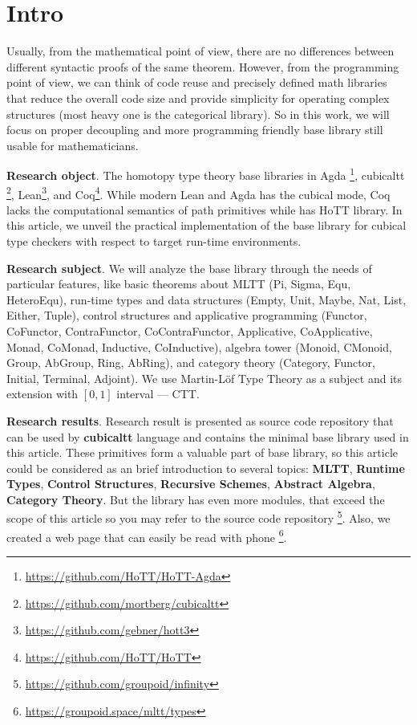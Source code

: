 \documentclass{article}
\begin{document}
\newpage
\tableofcontents

\newpage
\section{Intro}

Usually, from the mathematical point of view, there are no differences between
different syntactic proofs of the same theorem. However, from the programming point of view, we can think of code reuse and precisely defined math libraries that reduce
the overall code size and provide simplicity for operating complex
structures (most heavy one is the categorical library). So in this work, we will focus
on proper decoupling and more programming friendly base library still usable
for mathematicians.

{\bf Research object}. The homotopy type theory base libraries in
Agda \footnote{\url{https://github.com/HoTT/HoTT-Agda}},
cubicaltt \footnote{\url{https://github.com/mortberg/cubicaltt}},
Lean\footnote{\url{ https://github.com/gebner/hott3}}, and
Coq\footnote{\url{https://github.com/HoTT/HoTT}}.
While modern Lean and Agda has the cubical mode, Coq lacks the computational semantics of path primitives
while has HoTT library. In this article, we unveil the practical implementation of the
base library for cubical type checkers with respect to target run-time environments.

{\bf Research subject}. We will analyze the base library through the needs of particular features,
like basic theorems about MLTT (Pi, Sigma, Equ, HeteroEqu), run-time types and data
structures (Empty, Unit, Maybe, Nat, List, Either, Tuple), control structures and applicative programming
(Functor, CoFunctor, ContraFunctor, CoContraFunctor, Applicative, CoApplicative, Monad,
CoMonad, Inductive, CoInductive), algebra tower (Monoid, CMonoid, Group, AbGroup, Ring, AbRing),
and category theory (Category, Functor, Initial, Terminal, Adjoint).
We use Martin-Löf Type Theory as a subject and its extension with $[0,1]$ interval --- CTT.

{\bf Research results}. Research result is presented as source code repository that can be used by
{\bf cubicaltt} language and contains the minimal base library used in this article.
These primitives form a valuable part of base library, so this article could be
considered as an brief introduction to several topics: {\bf MLTT}, {\bf Runtime Types},
{\bf Control Structures},  {\bf Recursive Schemes},
{\bf Abstract Algebra}, {\bf Category Theory}.
But the library has even more modules, that
exceed the scope of this article so you may refer to the source code
repository \footnote{\url{https://github.com/groupoid/infinity}}.
Also, we created a web page that can easily be read with phone \footnote{\url{https://groupoid.space/mltt/types}}.
\end{document}
